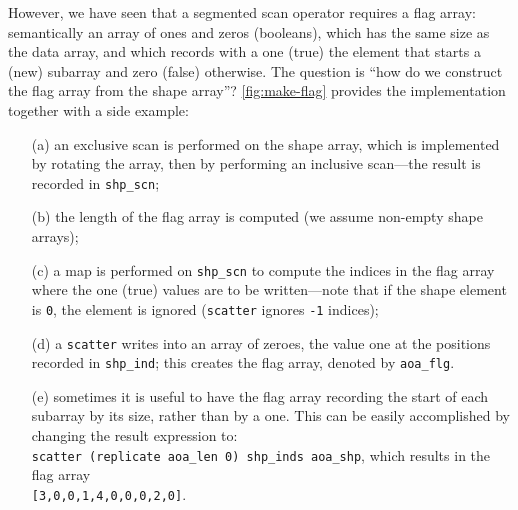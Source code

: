 \documentclass[acmsmall,review]{acmart}\settopmatter{printfolios=true,printccs=false,printacmref=false}
\begin{document}
However, we have seen that a segmented scan operator requires
a flag array: semantically an array of ones and zeros (booleans),  
which has the same size as the data array, and which records with
a one (true) the element that starts a (new) subarray and zero (false)
otherwise. The question is ``how do we construct the flag array from
the shape array''?  \cref{fig:make-flag} provides the implementation
together with a side example:
\begin{itemize}

    \item[(a)] an exclusive scan is performed on the shape array,
            which is implemented by rotating the array, then by
            performing an inclusive scan---the result is recorded 
            in {\tt shp\_scn};
    \item[(b)] the length of the flag array is computed 
            (we assume non-empty shape arrays);
    \item[(c)] a map is performed on {\tt shp\_scn} to compute
            the indices in the flag array where the one (true) values
            are to be written---note that if the shape element is 
            {\tt 0}, the element is ignored (\lstinline{scatter} ignores
            {\tt-1} indices);
    \item[(d)] a \lstinline{scatter} writes into an array of zeroes,
            the value one at the positions recorded in {\tt shp\_ind};
            this creates the flag array, denoted by {\tt aoa\_flg}.
    \item[(e)] sometimes it is useful to have the flag array
            recording the start of each subarray by its size,
            rather than by a one. This can be easily accomplished
            by changing the result expression to:\\
            \lstinline{scatter (replicate aoa_len 0) shp_inds aoa_shp},
            which results in the flag array\\
            {\tt[3,0,0,1,4,0,0,0,2,0]}.
\end{itemize}
\end{document}
